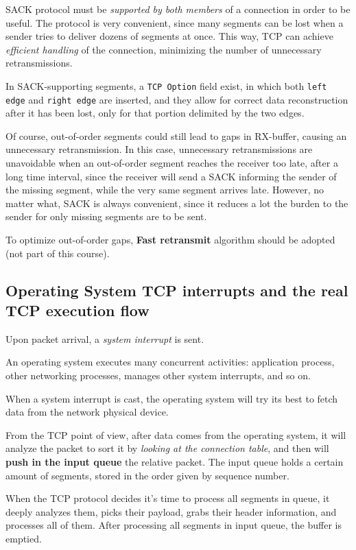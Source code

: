 \documentclass[10pt]{\classname}
\begin{document}
SACK protocol must be \emph{supported by both members} of a connection in order
to be useful. The protocol is very convenient, since many segments can be lost
when a sender tries to deliver dozens of segments at once. This way, TCP can
achieve \emph{efficient handling} of the connection, minimizing the number of
unnecessary retransmissions.

In SACK\--supporting segments, a \texttt{TCP Option} field exist, in which both
\texttt{left edge} and \texttt{right edge} are inserted, and they allow for
correct data reconstruction after it has been lost, only for that portion
delimited by the two edges.

Of course, out-of-order segments could still lead to gaps in RX-buffer, causing
an unnecessary retransmission. In this case, unnecessary retransmissions are
unavoidable when an out-of-order segment reaches the receiver too late, after a
long time interval, since the receiver will send a SACK informing the sender of
the missing segment, while the very same segment arrives late. However, no
matter what, SACK is always convenient, since it reduces a lot the burden to
the sender for only missing segments are to be sent.

To optimize out-of-order gaps, \textbf{Fast retransmit} algorithm should be
adopted (not part of this course).

\subsection{Operating System TCP interrupts and the real TCP execution flow}

Upon packet arrival, a \emph{system interrupt} is sent. 

An operating system executes many concurrent activities: application process, other networking processes, manages other system interrupts, and so on.

When a system interrupt is cast, the operating system will try its best to fetch data from the network physical device.

From the TCP point of view, after data comes from the operating system, it will
analyze the packet to sort it by \emph{looking at the connection table}, and
then will \textbf{push in the input queue} the relative packet. The input
queue holds a certain amount of segments, stored in the order given by sequence
number.

When the TCP protocol decides it's time to process all segments in queue, it
deeply analyzes them, picks their payload, grabs their header information, and
processes all of them. After processing all segments in input queue, the buffer
is emptied.
\end{document}
